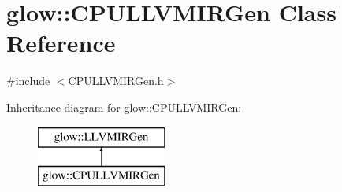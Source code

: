 \hypertarget{classglow_1_1_c_p_u_l_l_v_m_i_r_gen}{}\section{glow\+:\+:C\+P\+U\+L\+L\+V\+M\+I\+R\+Gen Class Reference}
\label{classglow_1_1_c_p_u_l_l_v_m_i_r_gen}


{\ttfamily \#include $<$C\+P\+U\+L\+L\+V\+M\+I\+R\+Gen.\+h$>$}

Inheritance diagram for glow\+:\+:C\+P\+U\+L\+L\+V\+M\+I\+R\+Gen\+:\begin{figure}[H]
\begin{center}
\leavevmode
\includegraphics[height=2.000000cm]{classglow_1_1_c_p_u_l_l_v_m_i_r_gen}
\end{center}
\end{figure}
